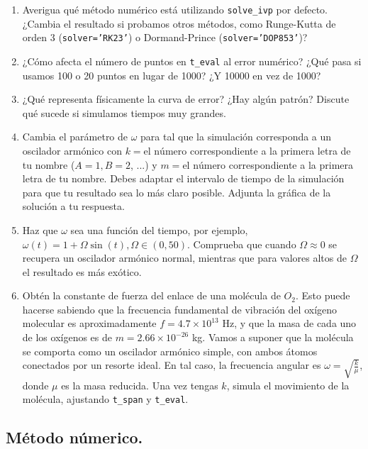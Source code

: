 \documentclass[a4paper,12pt]{article} %
\begin{document}
\begin{enumerate}
    \item Averigua qué método numérico está utilizando \texttt{solve\_ivp} por defecto. ¿Cambia el resultado si probamos otros métodos, como Runge-Kutta de orden 3 (\texttt{solver='RK23'}) o Dormand-Prince (\texttt{solver='DOP853'})?
    
    \item ¿Cómo afecta el número de puntos en \texttt{t\_eval} al error numérico? ¿Qué pasa si usamos 100 o 20 puntos en lugar de 1000? ¿Y 10000 en vez de 1000?
    
    \item ¿Qué representa físicamente la curva de error? ¿Hay algún patrón? Discute qué sucede si simulamos tiempos muy grandes.
    
    \item Cambia el parámetro de \(\omega\) para tal que la simulación corresponda a un oscilador armónico con \(k = \textrm{el número}\) correspondiente a la primera letra de tu nombre (\(A=1, B=2\), ...) y \(m = \textrm{el número}\) correspondiente a la primera letra de tu nombre. Debes adaptar el intervalo de tiempo de la simulación para que tu resultado sea lo más claro posible. Adjunta la gráfica de la solución a tu respuesta.
    
    \item Haz que \(\omega\) sea una función del tiempo, por ejemplo, \(\omega(t) = 1 + \Omega\sin(t), \Omega \in (0,50)\). Comprueba que cuando \(\Omega \approx 0\) se recupera un oscilador armónico normal, mientras que para valores altos de \(\Omega\) el resultado es más exótico.
    
    \item Obtén la constante de fuerza del enlace de una molécula de \(O_{2}\). Esto puede hacerse sabiendo que la frecuencia fundamental de vibración del oxígeno molecular es aproximadamente \(f = 4.7 \times 10^{13}\) Hz, y que la masa de cada uno de los oxígenos es de \(m = 2.66 \times 10^{-26}\) kg. Vamos a suponer que la molécula se comporta como un oscilador armónico simple, con ambos átomos conectados por un resorte ideal. En tal caso, la frecuencia angular es \(\omega = \sqrt{\frac{k}{\mu}}\), donde \(\mu\) es la masa reducida. Una vez tengas \(k\), simula el movimiento de la molécula, ajustando \texttt{t\_span} y \texttt{t\_eval}.
\end{enumerate}

\subsection{Método númerico.}
\end{document}
